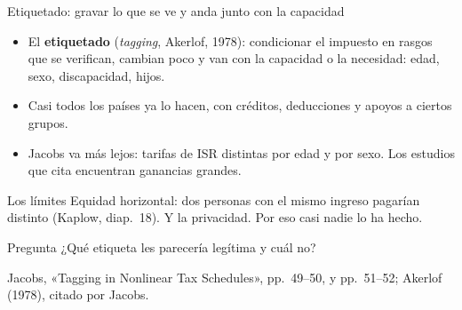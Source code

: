 \documentclass[aspectratio=169,11pt]{beamer}
\newcommand{\fuente}[1]{\par\vfill{\small\color{cGris}#1\par}}
\begin{document}
\begin{frame}{Etiquetado: gravar lo que se ve y anda junto con la capacidad}
  \begin{itemize}
    \item El \textbf{etiquetado} (\emph{tagging}, Akerlof, 1978): condicionar el impuesto en rasgos que se verifican, cambian poco y van con la capacidad o la necesidad: edad, sexo, discapacidad, hijos.
    \item Casi todos los países ya lo hacen, con créditos, deducciones y apoyos a ciertos grupos.
    \item Jacobs va más lejos: tarifas de ISR distintas por edad y por sexo. Los estudios que cita encuentran ganancias grandes.
  \end{itemize}
  \pause
  \begin{block}{Los límites}
    Equidad horizontal: dos personas con el mismo ingreso pagarían distinto (Kaplow, diap.~18). Y la privacidad. Por eso casi nadie lo ha hecho.
  \end{block}
  \pause
  \begin{alertblock}{Pregunta}
    ¿Qué etiqueta les parecería legítima y cuál no?
  \end{alertblock}
  \fuente{Jacobs, «Tagging in Nonlinear Tax Schedules», pp.~49--50, y pp.~51--52; Akerlof (1978), citado por Jacobs.}
\end{frame}
\end{document}
